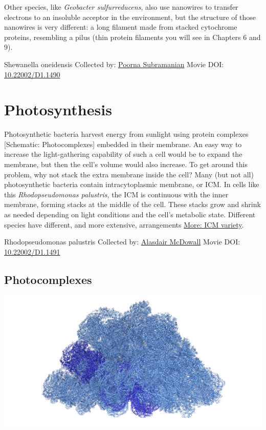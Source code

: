 \documentclass[]{tufte-book}
\begin{document}
Other species, like \emph{Geobacter sulfurreducens}, also use nanowires to transfer electrons to an insoluble acceptor in the environment, but the structure of those nanowires is very different: a long filament made from stacked cytochrome proteins, resembling a pilus (thin protein filaments you will see in Chapters 6 and 9).



\hypertarget{htmlwidget-26510453ec619112dfef}{}

\label{fig:4-2}Shewanella oneidensis Collected by: \protect\hyperlink{poorna_subramanian}{Poorna Subramanian} Movie DOI: \href{https://doi.org/10.22002/D1.1490}{10.22002/D1.1490}

\hypertarget{photosynthesis}{%
\section{Photosynthesis}\label{photosynthesis}}

Photosynthetic bacteria harvest energy from sunlight using protein complexes {[}Schematic: Photocomplexes{]} embedded in their membrane. An easy way to increase the light-gathering capability of such a cell would be to expand the membrane, but then the cell's volume would also increase. To get around this problem, why not stack the extra membrane inside the cell? Many (but not all) photosynthetic bacteria contain intracytoplasmic membrane, or ICM. In cells like this \emph{Rhodopseudomonas palustris}, the ICM is continuous with the inner membrane, forming stacks at the middle of the cell. These stacks grow and shrink as needed depending on light conditions and the cell's metabolic state. Different species have different, and more extensive, arrangements \protect\hyperlink{ICM_variety}{More: ICM variety}.



\hypertarget{htmlwidget-5022f61efc21002c784d}{}

\label{fig:4-3}Rhodopseudomonas palustris Collected by: \protect\hyperlink{alasdair_mcdowall}{Alasdair McDowall} Movie DOI: \href{https://doi.org/10.22002/D1.1491}{10.22002/D1.1491}

\hypertarget{Photocomplexes}{%
\subsection{Photocomplexes}\label{Photocomplexes}}

\includegraphics{img/schematics/4_3_1}
\end{document}
